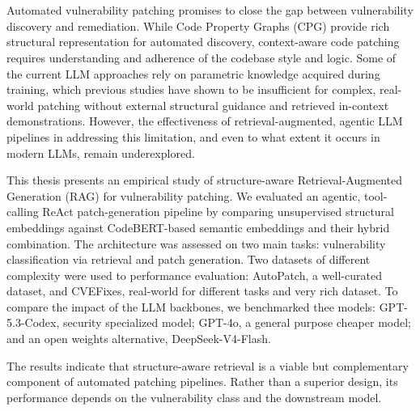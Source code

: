 \chapter{\abstractname}

Automated vulnerability patching promises to close the gap between vulnerability discovery and remediation. While Code Property Graphs (CPG) provide rich structural representation for automated discovery, context-aware code patching requires understanding and adherence of the codebase style and logic. 
Some of the current LLM approaches rely on parametric knowledge acquired during training, which previous studies have shown to be insufficient for complex, real-world patching without external structural guidance and retrieved in-context demonstrations\cite{ye2026well, yin2024thinkrepair, gao2023what, shao2026fix}.
However, the effectiveness of retrieval-augmented, agentic LLM pipelines in addressing this limitation, and even to what extent it occurs in modern LLMs, remain underexplored. 

This thesis presents an empirical study of  structure-aware Retrieval-Augmented Generation (RAG) for vulnerability patching. We evaluated an agentic, tool-calling ReAct patch-generation pipeline by comparing unsupervised structural  embeddings against CodeBERT-based semantic embeddings and their hybrid combination.
The architecture was assessed on two main tasks: vulnerability classification via retrieval and patch generation.
Two datasets of different complexity were used to performance evaluation: AutoPatch, a well-curated dataset, and CVEFixes, real-world for different tasks and very rich dataset.
To compare the impact of the LLM backbones, we benchmarked thee models: GPT-5.3-Codex, security specialized model; GPT-4o, a general purpose cheaper model; and an open weights alternative, DeepSeek-V4-Flash.

The results indicate that structure-aware retrieval is a viable but complementary component of automated patching pipelines. Rather than a superior design, its performance depends on the vulnerability class and the downstream model.

